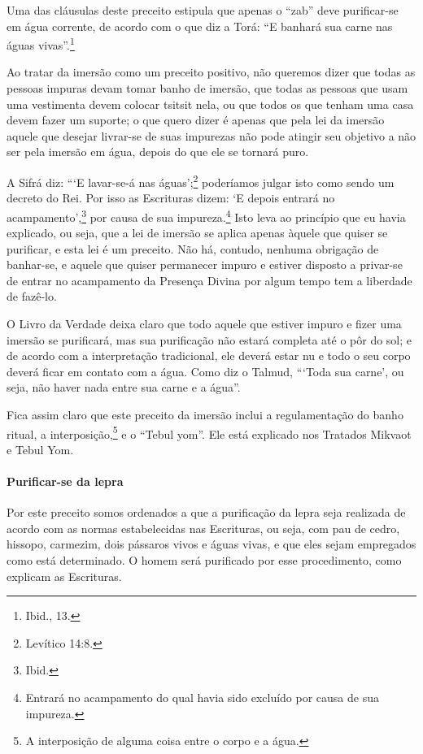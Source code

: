 Uma das cláusulas deste preceito estipula que apenas o ``zab'' deve
purificar-se em água corrente, de acordo com o que diz a Torá: ``E
banhará sua carne nas águas vivas''.\footnote{Ibid., 13.}

Ao tratar da imersão como um preceito positivo, não queremos dizer que
todas as pessoas impuras devam tomar banho de imersão, que todas
as pessoas que usam uma vestimenta devem colocar tsitsit nela, ou
que todos os que tenham uma casa devem fazer um suporte; o que quero
dizer é apenas que pela lei da imersão aquele que desejar livrar-se de
suas impurezas não pode atingir seu objetivo a não ser pela imersão em
água, depois do que ele se tornará puro.

A Sifrá diz: ```E lavar-se-á nas águas';\footnote{Levítico 14:8.} poderíamos
julgar isto como sendo um decreto do Rei. Por isso as Escrituras dizem:
`E depois entrará no acampamento',\footnote{Ibid.} por causa de sua
impureza.\footnote{Entrará no acampamento do qual havia sido excluído por causa de sua
  impureza.} Isto leva ao princípio que eu havia
explicado, ou seja, que a lei de imersão se aplica apenas àquele que
quiser se purificar, e esta lei é um preceito. Não há, contudo, nenhuma
obrigação de banhar-se, e aquele que quiser permanecer impuro e estiver
disposto a privar-se de entrar no acampamento da Presença Divina por
algum tempo tem a liberdade de fazê-lo.

O Livro da Verdade deixa claro que todo aquele que estiver impuro e
fizer uma imersão se purificará, mas sua purificação não estará completa
até o pôr do sol; e de acordo com a interpretação tradicional, ele
deverá estar nu e todo o seu corpo deverá ficar em contato com a água.
Como diz o Talmud, ```Toda sua carne', ou seja, não haver nada entre sua
carne e a água''.

Fica assim claro que este preceito da imersão inclui a regulamentação
do banho ritual, a interposição,\footnote{A interposição de alguma coisa entre o corpo e a água.} e o ``Tebul
yom''. Ele está explicado nos Tratados Mikvaot e Tebul Yom.

\paragraph{Purificar-se da lepra}

Por este preceito somos ordenados a que a purificação da lepra seja
realizada de acordo com as normas estabelecidas nas Escrituras, ou seja,
com pau de cedro, hissopo, carmezim, dois pássaros vivos e águas vivas,
e que eles sejam empregados como está determinado. O homem será
purificado por esse procedimento, como explicam as Escrituras.

